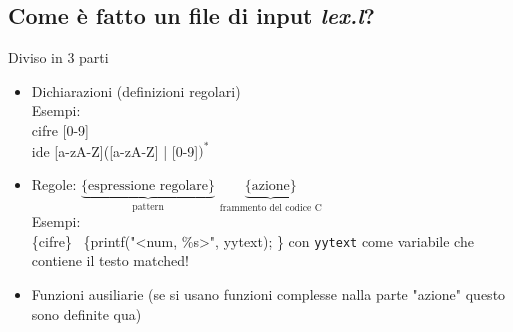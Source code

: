 \documentclass[a4paper,12pt]{article}
\begin{document}
{\subsection{Come è fatto un file di input \textit{lex.l}?}
Diviso in 3 parti
\begin{itemize}
    \item Dichiarazioni (definizioni regolari) \\
    Esempi: \\
    cifre [0-9] \\
    ide [a-zA-Z]([a-zA-Z] | [0-9]$)^*$
    \item Regole: $\underbrace{\text{\{espressione regolare\}}}_{\text{pattern}}$ $\underbrace{\text{\{azione\}}}_{\text{frammento del codice C}}$ \\
    Esempi: \\
    \{cifre\} \, \{printf("<num, \%s>", yytext); \} con \texttt{yytext} come variabile che contiene il testo matched!
    \item Funzioni ausiliarie (se si usano funzioni complesse nalla parte "azione" questo sono definite qua)
\end{itemize}
}
\end{document}
